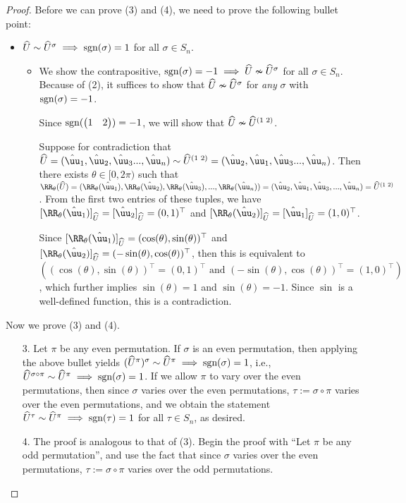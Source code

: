 \begin{proof}
    Before we can prove (3) and (4), we need to prove the following bullet point:

    \begin{itemize}
        \item $\widehat{U} \sim \widehat{U}^\sigma \implies \text{sgn}(\sigma) = 1$ for all $\sigma \in S_n$.
        \begin{itemize}
            \item We show the contrapositive, $\text{sgn}(\sigma) = -1 \implies \widehat{U} \nsim \widehat{U}^\sigma$ for all $\sigma \in S_n$. Because of (2), it suffices to show that $\widehat{U} \nsim \widehat{U}^\sigma$ for \textit{any} $\sigma$ with $\text{sgn}(\sigma) = -1$.

            Since $\text{sgn}(\begin{pmatrix} 1 & 2 \end{pmatrix}) = -1$, we will show that $\widehat{U} \nsim \widehat{U}^{(1 \text{ } 2)}$.
            
            Suppose for contradiction that $\hU = (\huu_1, \huu_2, \huu_3 ..., \huu_n) \sim \hU^{(1 \spc 2)} = (\huu_2, \huu_1, \huu_3 ..., \huu_n)$. Then there exists $\theta \in [0, 2\pi)$ such that ${\RR_\theta(\hU) = (\RR_\theta(\huu_1), \RR_\theta(\huu_2), \RR_\theta(\huu_3), ..., \RR_\theta(\huu_n)) = (\huu_2, \huu_1, \huu_3, ..., \huu_n) = \hU^{(1 \spc 2)}}$. From the first two entries of these tuples, we have $[\RR_\theta(\huu_1)]_{\hU} = [\huu_2]_{\hU} = (0, 1)^\top$ and $[\RR_\theta(\huu_2)]_{\hU} = [\huu_1]_{\hU} = (1, 0)^\top$.
            
            Since $[\RR_\theta(\huu_1)]_{\hU} = (\cos(\theta), \sin(\theta))^\top$ and ${[\RR_\theta(\huu_2)]_{\hU} = (-\sin(\theta), \cos(\theta))^\top}$, then this is equivalent to $((\cos(\theta), \sin(\theta))^\top = (0, 1)^\top \text{ and } (-\sin(\theta), \cos(\theta))^\top = (1, 0)^\top)$, which further implies $\sin(\theta) = 1$ and $\sin(\theta) = -1$. Since $\sin$ is a well-defined function, this is a contradiction.
        \end{itemize}
    \end{itemize}

    Now we prove (3) and (4).
    
    \begin{enumerate}
        \item[3.] Let $\pi$ be any even permutation. If $\sigma$ is an even permutation, then applying the above bullet yields $(\widehat{U}^\pi)^\sigma \sim \widehat{U}^\pi \implies \text{sgn}(\sigma) = 1$, i.e., $\widehat{U}^{\sigma \circ \pi} \sim \widehat{U}^\pi \implies \text{sgn}(\sigma) = 1$. If we allow $\pi$ to vary over the even permutations, then since $\sigma$ varies over the even permutations, $\tau := \sigma \circ \pi$ varies over the even permutations, and we obtain the statement $\widehat{U}^\tau \sim \widehat{U}^\pi \implies \text{sgn}(\tau) = 1$ for all $\tau \in S_n$, as desired.
        \item[4.] The proof is analogous to that of (3). Begin the proof with ``Let $\pi$ be any odd permutation'', and use the fact that since $\sigma$ varies over the even permutations, $\tau := \sigma \circ \pi$ varies over the odd permutations.
    \end{enumerate}
\end{proof}

